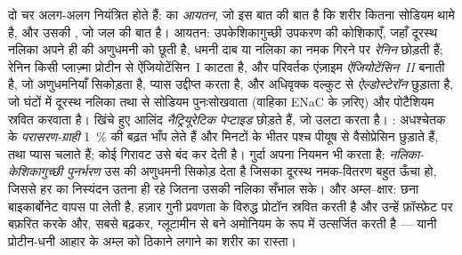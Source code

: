 \begin{definition}[नियंत्रण]\label{def:b3:renal-osmoregulation:controls}
दो चर अलग-अलग नियंत्रित होते हैं:  का \emph{आयतन},
जो इस बात की बात है कि शरीर कितना सोडियम थामे है, और उसकी
\emph{}, जो जल की बात है। आयतन: उपकेशिकागुच्छी उपकरण की
कोशिकाएँ, जहाँ दूरस्थ नलिका अपने ही  की अणुधमनी को छूती है,
धमनी दाब या नलिका का नमक गिरने पर \emph{रेनिन} छोड़ती हैं; रेनिन किसी
प्लाज़्मा प्रोटीन से ऐंजियोटेंसिन~I काटता है, और परिवर्तक एंज़ाइम
\emph{ऐंजियोटेंसिन~II} बनाती है, जो अणुधमनियाँ सिकोड़ता है, प्यास
उद्दीप्त करता है, और अधिवृक्क वल्कुट से \emph{ऐल्डोस्टेरॉन} छुड़ाता
है, जो घंटों में दूरस्थ नलिका तथा  से सोडियम पुनःसोखवाता
(वाहिका ENaC के ज़रिए) और पोटैशियम स्रवित करवाता है। खिंचे हुए आलिंद
\emph{नैट्रियूरेटिक पेप्टाइड} छोड़ते हैं, जो उलटा करता है।
: अधश्चेतक के \emph{परासरण-ग्राही} \qty{1}{\%} की बढ़त भाँप
लेते हैं और मिनटों के भीतर पश्च पीयूष से वैसोप्रेसिन छुड़ाते हैं, तथा
प्यास चलाते हैं; कोई गिरावट उसे बंद कर देती है। गुर्दा अपना नियमन भी
करता है: \emph{नलिका-केशिकागुच्छी पुनर्भरण} उस  की अणुधमनी
सिकोड़ देता है जिसका दूरस्थ नमक-वितरण बहुत ऊँचा हो, जिससे हर 
का निस्यंदन उतना ही रहे जितना उसकी नलिका सँभाल सके। और अम्ल--क्षार:
 छना बाइकार्बोनेट वापस पा लेती है,  हज़ार गुनी
प्रवणता के विरुद्ध प्रोटॉन स्रवित करती है और उन्हें फ़ॉस्फ़ेट पर
बफ़रित करके और, सबसे बढ़कर, ग्लूटामीन से बने अमोनियम के रूप में
उत्सर्जित करती है --- यानी प्रोटीन-धनी आहार के अम्ल को ठिकाने लगाने का
शरीर का रास्ता।
\end{definition}

